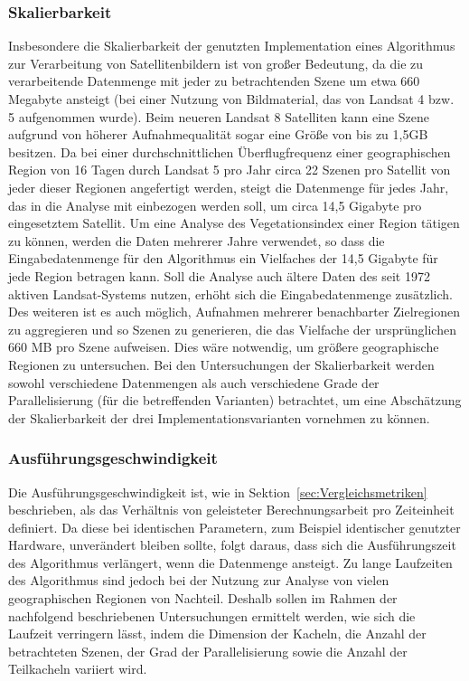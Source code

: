 \subsubsection{Skalierbarkeit}
Insbesondere die Skalierbarkeit der genutzten Implementation eines Algorithmus zur Verarbeitung von Satellitenbildern ist von großer Bedeutung, da die zu verarbeitende Datenmenge mit jeder zu betrachtenden Szene um etwa 660 Megabyte ansteigt (bei einer Nutzung von Bildmaterial, das von Landsat 4 bzw. 5 aufgenommen wurde). Beim neueren Landsat 8 Satelliten kann eine Szene aufgrund von höherer Aufnahmequalität sogar eine Größe von bis zu 1,5GB besitzen. Da bei einer durchschnittlichen Überflugfrequenz einer geographischen Region von 16 Tagen durch Landsat 5 pro Jahr circa 22 Szenen pro Satellit von jeder dieser Regionen angefertigt werden, steigt die Datenmenge für jedes Jahr, das in die Analyse mit einbezogen werden soll, um circa 14,5 Gigabyte pro eingesetztem Satellit. Um eine Analyse des Vegetationsindex einer Region tätigen zu können, werden die Daten mehrerer Jahre verwendet, so dass die Eingabedatenmenge für den Algorithmus ein Vielfaches der 14,5 Gigabyte für jede Region betragen kann. Soll die Analyse auch ältere Daten des seit 1972 aktiven Landsat-Systems nutzen, erhöht sich die Eingabedatenmenge zusätzlich. Des weiteren ist es auch möglich, Aufnahmen mehrerer benachbarter Zielregionen zu aggregieren und so Szenen zu generieren, die das Vielfache der ursprünglichen 660 MB pro Szene aufweisen. Dies wäre notwendig, um größere geographische Regionen zu untersuchen. 
Bei den Untersuchungen der Skalierbarkeit werden sowohl verschiedene Datenmengen als auch verschiedene Grade der Parallelisierung (für die betreffenden Varianten) betrachtet, um eine Abschätzung der Skalierbarkeit der drei Implementationsvarianten vornehmen zu können.

\subsubsection{Ausführungsgeschwindigkeit}
Die Ausführungsgeschwindigkeit ist, wie in Sektion~\ref{sec:Vergleichsmetriken} beschrieben, als das Verhältnis von geleisteter Berechnungsarbeit pro Zeiteinheit definiert. Da diese bei identischen Parametern, zum Beispiel identischer genutzter Hardware, unverändert bleiben sollte, folgt daraus, dass sich die Ausführungszeit des Algorithmus verlängert, wenn die Datenmenge ansteigt. Zu lange Laufzeiten des Algorithmus sind jedoch bei der Nutzung zur Analyse von vielen geographischen Regionen von Nachteil. Deshalb sollen im Rahmen der nachfolgend beschriebenen Untersuchungen ermittelt werden, wie sich die Laufzeit verringern lässt, indem die Dimension der Kacheln, die Anzahl der betrachteten Szenen, der Grad der Parallelisierung sowie die Anzahl der Teilkacheln variiert wird. 

